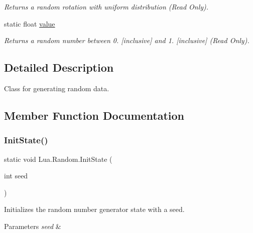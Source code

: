 \begin{DoxyCompactItemize}
\begin{DoxyCompactList}\small\item\em Returns a random rotation with uniform distribution (Read Only). \end{DoxyCompactList}\item 
static float \mbox{\hyperlink{class_lua_1_1_random_a058b72bbd12cd2d665b14d0479b52ad7}{value}}
\begin{DoxyCompactList}\small\item\em Returns a random number between 0. \mbox{[}inclusive\mbox{]} and 1. \mbox{[}inclusive\mbox{]} (Read Only). \end{DoxyCompactList}\end{DoxyCompactItemize}


\subsection{Detailed Description}
Class for generating random data. 



\subsection{Member Function Documentation}
\mbox{\label{class_lua_1_1_random_ac69b6f407406ae02a7595403097ec8a8}} 
\subsubsection{\texorpdfstring{InitState()}{InitState()}}
{\footnotesize\ttfamily static void Lua.\+Random.\+Init\+State (\begin{DoxyParamCaption}\item[{int}]{seed }\end{DoxyParamCaption})\hspace{0.3cm}{\ttfamily [static]}}



Initializes the random number generator state with a seed. 


\begin{DoxyParams}{Parameters}
{\em seed} & \\
\hline
\end{DoxyParams}
\mbox{\label{class_lua_1_1_random_ab17e85e47aeaa3f719b649e51bb49d28}} 
